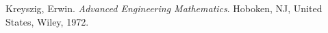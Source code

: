 \begin{thebibliography}{12}










Kreyszig, Erwin. \emph{Advanced Engineering Mathematics}. Hoboken, NJ, United States, Wiley, 1972.


\end{thebibliography}
